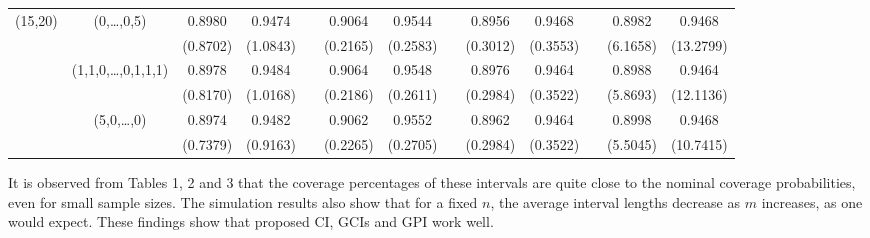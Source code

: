 \documentclass[12pt]{article}
\begin{document}
{\begin{center}
\begin{tabular}{ccccccccccccc}
(15,20) & (0,\dots,0,5)       & 0.8980  &  0.9474 && 0.9064  &  0.9544 && 0.8956  &  0.9468 && 0.8982  &  0.9468\\
        &                     &(0.8702) & (1.0843)&&(0.2165) & (0.2583)&&(0.3012) & (0.3553)&&(6.1658) & (13.2799)\\
        &(1,1,0,\dots,0,1,1,1)& 0.8978  &  0.9484 && 0.9064  &  0.9548 && 0.8976  &  0.9464 && 0.8988  &  0.9464\\
        &                     &(0.8170) & (1.0168)&&(0.2186) & (0.2611)&&(0.2984) & (0.3522)&&(5.8693) & (12.1136)\\
        & (5,0,\dots,0)       & 0.8974  &  0.9482 && 0.9062  &  0.9552 && 0.8962  &  0.9464 && 0.8998  &  0.9468\\
        &                     &(0.7379) & (0.9163)&&(0.2265) & (0.2705)&&(0.2984) & (0.3522)&&(5.5045) & (10.7415)\\\hline
\end{tabular}
\end{center}}

\newpage

It is observed from Tables 1, 2 and 3 that %
the coverage percentages of these intervals are quite close to the nominal coverage probabilities, even for small sample sizes.
The simulation results also show that for a fixed $n$, the average interval lengths decrease as $m$ increases, as one would expect. %
These findings show that proposed CI, GCIs and GPI work well.
\end{document}
